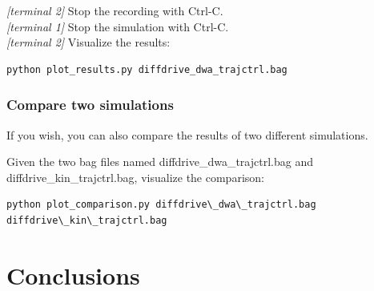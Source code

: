 \documentclass[11pt,a4paper]{article}
\begin{document}
\textit{[terminal 2]} Stop the recording with Ctrl-C.\\

\textit{[terminal 1]} Stop the simulation with Ctrl-C.\\

\textit{[terminal 2]} Visualize the results:
\begin{lstlisting}
python plot_results.py diffdrive_dwa_trajctrl.bag
\end{lstlisting}


\subsubsection{Compare two simulations}

If you wish, you can also compare the results of two different simulations.

Given the two bag files named diffdrive\_dwa\_trajctrl.bag and diffdrive\_kin\_trajctrl.bag, visualize the comparison:
\begin{lstlisting}
python plot_comparison.py diffdrive\_dwa\_trajctrl.bag diffdrive\_kin\_trajctrl.bag
\end{lstlisting}



\section{Conclusions}
\end{document}
